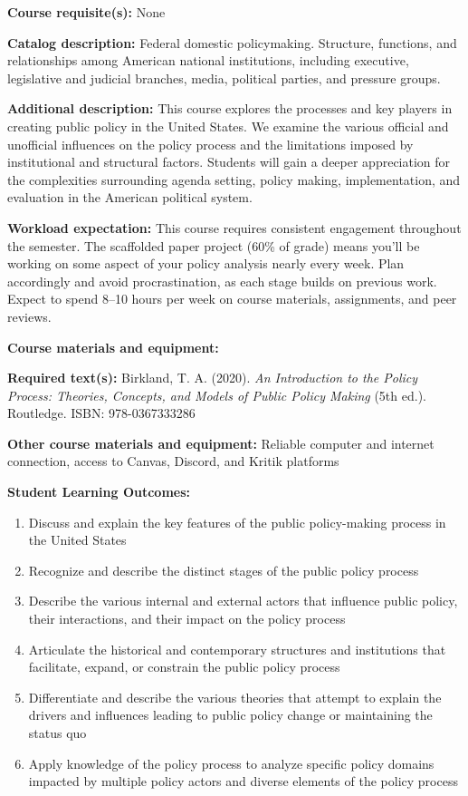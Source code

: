 \documentclass[12pt]{article}     %
\begin{document}
\vspace{0.5em}
\begin{flatlist}
\item \textbf{Course requisite(s):} None
\item \textbf{Catalog description:} Federal domestic policymaking. Structure, functions, and relationships among American national institutions, including executive, legislative and judicial branches, media, political parties, and pressure groups.
\item \textbf{Additional description:} This course explores the processes and key players in creating public policy in the United States. We examine the various official and unofficial influences on the policy process and the limitations imposed by institutional and structural factors. Students will gain a deeper appreciation for the complexities surrounding agenda setting, policy making, implementation, and evaluation in the American political system.
\item \textbf{Workload expectation:} This course requires consistent engagement throughout the semester. The scaffolded paper project (60\% of grade) means you'll be working on some aspect of your policy analysis nearly every week. Plan accordingly and avoid procrastination, as each stage builds on previous work. Expect to spend 8--10 hours per week on course materials, assignments, and peer reviews.
\item \textbf{Course materials and equipment:} ~
\item \textbf{Required text(s):} Birkland, T. A. (2020). \emph{An Introduction to the Policy Process: Theories, Concepts, and Models of Public Policy Making} (5th ed.). Routledge. ISBN: 978-0367333286
\item \textbf{Other course materials and equipment:} Reliable computer and internet connection, access to Canvas, Discord, and Kritik platforms
\end{flatlist}

\vspace{1em}
\noindent \textbf{Student Learning Outcomes:}
\begin{enumerate}
\item Discuss and explain the key features of the public policy-making process in the United States
\item Recognize and describe the distinct stages of the public policy process
\item Describe the various internal and external actors that influence public policy, their interactions, and their impact on the policy process
\item Articulate the historical and contemporary structures and institutions that facilitate, expand, or constrain the public policy process
\item Differentiate and describe the various theories that attempt to explain the drivers and influences leading to public policy change or maintaining the status quo
\item Apply knowledge of the policy process to analyze specific policy domains impacted by multiple policy actors and diverse elements of the policy process
\end{enumerate}
\end{document}
